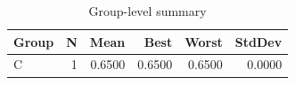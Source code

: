 \begin{table}[htbp]
\centering
\caption{Group-level summary}
\label{tab:group-summary}
\begin{tabular}{lrrrrr}
\toprule
\textbf{Group} & \textbf{N} & \textbf{Mean} & \textbf{Best} & \textbf{Worst} & \textbf{StdDev} \\
\midrule
C & 1 & 0.6500 & 0.6500 & 0.6500 & 0.0000 \\
\bottomrule
\end{tabular}
\end{table}